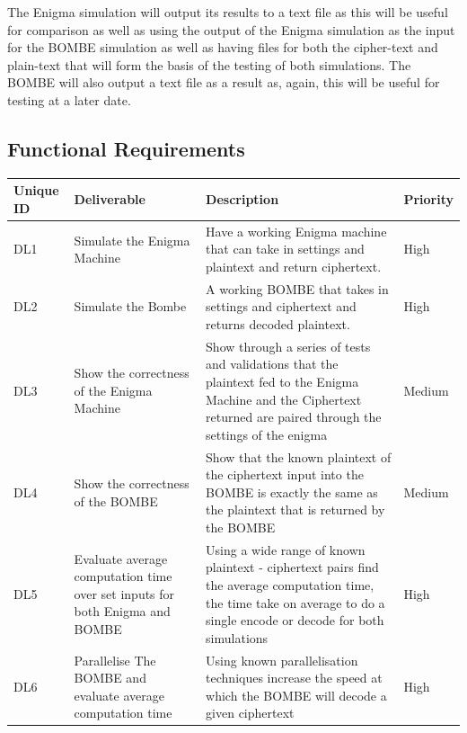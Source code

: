 \documentclass[12pt,a4paper]{article}
\begin{document}
The Enigma simulation will output its results to a text file as this will be useful for comparison as well as using the output of the Enigma simulation as the input for the BOMBE simulation as well as having files for both the cipher-text and plain-text that will form the basis of the testing of both simulations. The BOMBE will also output a text file as a result as, again, this will be useful for testing at a later date. 

\subsection{Functional Requirements}

\begin{table}[htb]
\centering
\caption{Functional Requirements}
\vspace*{6pt}
\label{units}
\begin{longtable}{ |p{1cm}|p{4cm}|p{5cm}|p{2cm}| }\hline\hline
Unique ID & Deliverable & Description & Priority \\ \hline
DL1 & Simulate the Enigma Machine & Have a working Enigma machine that can take in settings and plaintext and return ciphertext. & High \\ \hline
DL2 & Simulate the Bombe & A working BOMBE that takes in settings and ciphertext and returns decoded plaintext. & High \\ \hline
DL3 & Show the correctness of the Enigma Machine & Show through a series of tests and validations that the plaintext fed to the Enigma Machine and the Ciphertext returned are paired through the settings of the enigma & Medium \\ \hline
DL4 & Show the correctness of the BOMBE & Show that the known plaintext of the ciphertext input into the BOMBE is exactly the same as the plaintext that is returned by the BOMBE & Medium \\ \hline
DL5 & Evaluate average computation time over set inputs for both Enigma and BOMBE & Using a wide range of known plaintext - ciphertext pairs find the average computation time, the time take on average to do a single encode or decode for both simulations & High \\ \hline
DL6 & Parallelise The BOMBE and evaluate average computation time & Using known parallelisation techniques increase the speed at which the BOMBE will decode a given ciphertext & High \\ \hline
\end{longtable}
\end{table}
\end{document}
